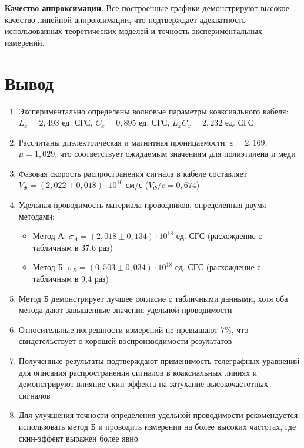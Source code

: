 \documentclass[a4paper]{article}
\begin{document}
\textbf{Качество аппроксимации}. Все построенные графики демонстрируют высокое качество линейной аппроксимации, что подтверждает адекватность использованных теоретических моделей и точность экспериментальных измерений.

\section{Вывод}

\begin{enumerate}
\item Экспериментально определены волновые параметры коаксиального кабеля: $L_x = 2,493$ ед. СГС, $C_x = 0,895$ ед. СГС, $L_x C_x = 2,232$ ед. СГС

\item Рассчитаны диэлектрическая и магнитная проницаемости: $\varepsilon = 2,169$, $\mu = 1,029$, что соответствует ожидаемым значениям для полиэтилена и меди

\item Фазовая скорость распространения сигнала в кабеле составляет $V_\Phi = (2,022 \pm 0,018) \cdot 10^{10}$ см/с ($V_\Phi/c = 0,674$)

\item Удельная проводимость материала проводников, определенная двумя методами:
\begin{itemize}
\item Метод А: $\sigma_A = (2,018 \pm 0,134) \cdot 10^{18}$ ед. СГС (расхождение с табличным в 37,6 раз)
\item Метод Б: $\sigma_B = (0,503 \pm 0,034) \cdot 10^{18}$ ед. СГС (расхождение с табличным в 9,4 раз)
\end{itemize}

\item Метод Б демонстрирует лучшее согласие с табличными данными, хотя оба метода дают завышенные значения удельной проводимости

\item Относительные погрешности измерений не превышают 7\%, что свидетельствует о хорошей воспроизводимости результатов

\item Полученные результаты подтверждают применимость телеграфных уравнений для описания распространения сигналов в коаксиальных линиях и демонстрируют влияние скин-эффекта на затухание высокочастотных сигналов

\item Для улучшения точности определения удельной проводимости рекомендуется использовать метод Б и проводить измерения на более высоких частотах, где скин-эффект выражен более явно
\end{enumerate}
\end{document}
